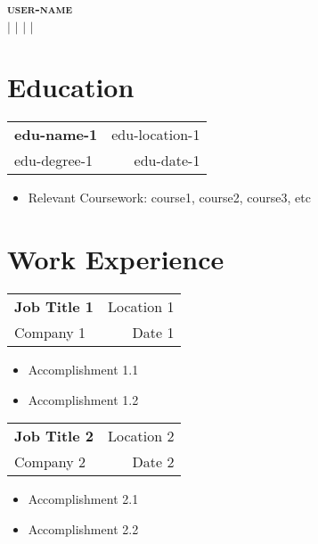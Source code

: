 \documentclass{article}
\newcommand{\educationitem}[4]{%
    \item
    \begin{tabularx}{\linewidth}{X r}
        \textbf{#1} & #2 \\
        #3 & #4
    \end{tabularx}
}
\newcommand{\experienceitem}[4]{%
    \item
    \begin{tabularx}{\linewidth}{X r}
        \textbf{#1} & #2 \\
        #3 & #4
    \end{tabularx}
}
\begin{document}
\begin{center}
    \textbf{\Large \scshape {user-name}} \\ \vspace{0pt}
    \small
    \hspace{.5pt}{user-phonenumber}
    $|$
    \hspace{.5pt}{user-email}
    $|$
    \hspace{.5pt}{user-linkedIn}
    $|$
    \hspace{.5pt}{user-gitHub}
    $|$
    \hspace{.5pt}{user-country, user-city}
\end{center}

\section{Education}
\begin{educationlist}
    \educationitem{edu-name-1}{edu-location-1}{edu-degree-1}{edu-date-1}
    \begin{itemize}
        \item Relevant Coursework: course1, course2, course3, etc
    \end{itemize}
\end{educationlist}

\section{Work Experience}
\begin{experiencelist}
    \experienceitem{Job Title 1}{Location 1}{Company 1}{Date 1}
    \begin{itemize}
        \item Accomplishment 1.1
        \item Accomplishment 1.2
    \end{itemize}
    
    \experienceitem{Job Title 2}{Location 2}{Company 2}{Date 2}
    \begin{itemize}
        \item Accomplishment 2.1
        \item Accomplishment 2.2
    \end{itemize}
\end{experiencelist}

\end{document}
